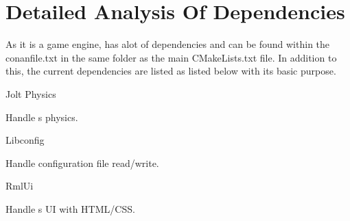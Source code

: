 \chapter{Detailed Analysis Of Dependencies}
\hypertarget{detailed-analysis-of-dependencies}{}\label{detailed-analysis-of-dependencies}


As it is a game engine,  has alot of dependencies and can be found within the conanfile.\+txt in the same folder as the main CMake\+Lists.\+txt file. In addition to this, the current dependencies are listed as listed below with it\textquotesingle{}s basic purpose.


\begin{DoxyItemize}
\item Jolt Physics
\begin{DoxyItemize}
\item Handle \textquotesingle{}s physics.
\end{DoxyItemize}
\item Libconfig
\begin{DoxyItemize}
\item Handle configuration file read/write.
\end{DoxyItemize}
\item Rml\+Ui
\begin{DoxyItemize}
\item Handle \textquotesingle{}s UI with HTML/\+CSS.
\end{DoxyItemize}
\item 
\end{DoxyItemize}